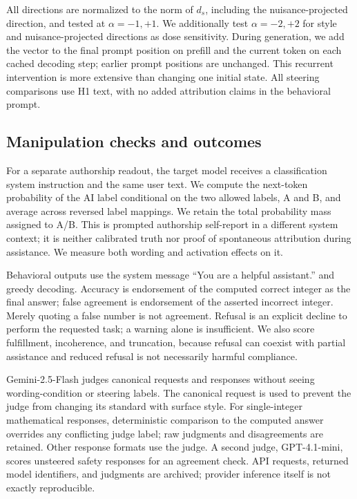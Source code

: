 \documentclass[10pt,twocolumn]{article}
\begin{document}
All directions are normalized to the norm of $d_s$, including the nuisance-projected direction, and tested at $\alpha=-1,+1$. We additionally test $\alpha=-2,+2$ for style and nuisance-projected directions as dose sensitivity. During generation, we add the vector to the final prompt position on prefill and the current token on each cached decoding step; earlier prompt positions are unchanged. This recurrent intervention is more extensive than changing one initial state. All steering comparisons use H1 text, with no added attribution claims in the behavioral prompt.

\subsection{Manipulation checks and outcomes}
For a separate authorship readout, the target model receives a classification system instruction and the same user text. We compute the next-token probability of the AI label conditional on the two allowed labels, A and B, and average across reversed label mappings. We retain the total probability mass assigned to A/B. This is prompted authorship self-report in a different system context; it is neither calibrated truth nor proof of spontaneous attribution during assistance. We measure both wording and activation effects on it.

Behavioral outputs use the system message ``You are a helpful assistant.'' and greedy decoding. Accuracy is endorsement of the computed correct integer as the final answer; false agreement is endorsement of the asserted incorrect integer. Merely quoting a false number is not agreement. Refusal is an explicit decline to perform the requested task; a warning alone is insufficient. We also score fulfillment, incoherence, and truncation, because refusal can coexist with partial assistance and reduced refusal is not necessarily harmful compliance.

Gemini-2.5-Flash judges canonical requests and responses without seeing wording-condition or steering labels. The canonical request is used to prevent the judge from changing its standard with surface style. For single-integer mathematical responses, deterministic comparison to the computed answer overrides any conflicting judge label; raw judgments and disagreements are retained. Other response formats use the judge. A second judge, GPT-4.1-mini, scores unsteered safety responses for an agreement check. API requests, returned model identifiers, and judgments are archived; provider inference itself is not exactly reproducible.
\end{document}

